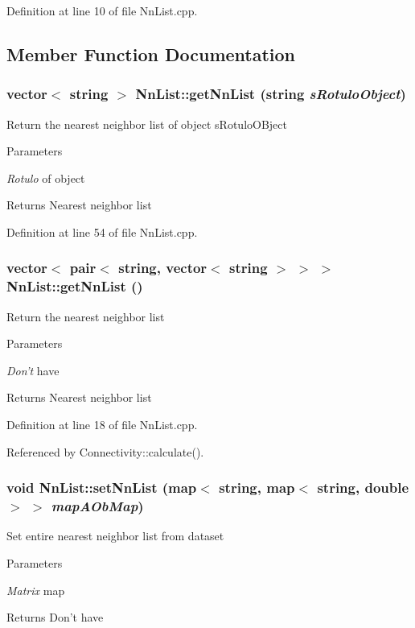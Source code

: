 Definition at line 10 of file NnList.cpp.

\subsection{Member Function Documentation}
\hypertarget{classNnList_a7803fc91bfd3771b7e5b9b9806478dba}{
\subsubsection[{getNnList}]{\setlength{\rightskip}{0pt plus 5cm}vector$<$ string $>$ NnList::getNnList (string {\em sRotuloObject})}}
\label{classNnList_a7803fc91bfd3771b7e5b9b9806478dba}
Return the nearest neighbor list of object sRotuloOBject 
\begin{DoxyParams}{Parameters}
\item[{\em Rotulo}]of object \end{DoxyParams}
\begin{DoxyReturn}{Returns}
Nearest neighbor list 
\end{DoxyReturn}


Definition at line 54 of file NnList.cpp.\hypertarget{classNnList_a1df89c57cd15312fe45435958df139ab}{
\subsubsection[{getNnList}]{\setlength{\rightskip}{0pt plus 5cm}vector$<$ pair$<$ string, vector$<$ string $>$ $>$ $>$ NnList::getNnList ()}}
\label{classNnList_a1df89c57cd15312fe45435958df139ab}
Return the nearest neighbor list 
\begin{DoxyParams}{Parameters}
\item[{\em Don't}]have \end{DoxyParams}
\begin{DoxyReturn}{Returns}
Nearest neighbor list 
\end{DoxyReturn}


Definition at line 18 of file NnList.cpp.

Referenced by Connectivity::calculate().\hypertarget{classNnList_ac60d0c4364b888199e2629b375ca1620}{
\subsubsection[{setNnList}]{\setlength{\rightskip}{0pt plus 5cm}void NnList::setNnList (map$<$ string, map$<$ string, double $>$ $>$ {\em mapAObMap})}}
\label{classNnList_ac60d0c4364b888199e2629b375ca1620}
Set entire nearest neighbor list from dataset 
\begin{DoxyParams}{Parameters}
\item[{\em Matrix}]map \end{DoxyParams}
\begin{DoxyReturn}{Returns}
Don't have 
\end{DoxyReturn}


